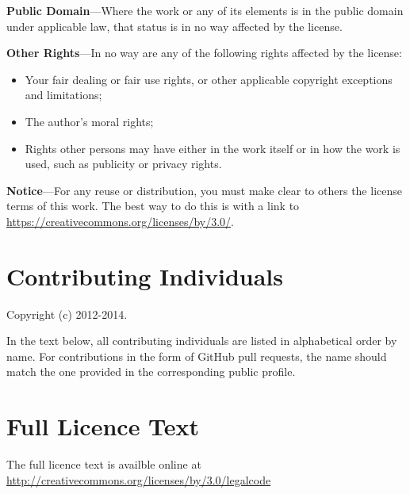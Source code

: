 \documentclass[a4paper,10pt,twoside]{book}
\begin{document}
\noindent \textbf{Public Domain}---Where the work or any of its
elements is in the public domain under applicable law, that status is
in no way affected by the license.

\noindent \textbf{Other Rights}---In no way are any of the following
rights affected by the license:

\begin{itemize}
\item Your fair dealing or fair use rights, or other applicable
copyright exceptions and limitations;

\item The author's moral rights;

\item Rights other persons may have either in the work itself or in
how the work is used, such as publicity or privacy rights.
\end{itemize}

\noindent \textbf{Notice}---For any reuse or distribution, you must make clear to
others the license terms of this work. The best way to do this is with
a link to \url{https://creativecommons.org/licenses/by/3.0/}.

\section{Contributing Individuals}

Copyright (c) 2012-2014.

\noindent In the text below, all contributing individuals are listed in alphabetical order by name. 
For contributions in the form of GitHub pull requests, the name should match the one provided in the corresponding public profile.

\noindent


\section{Full Licence Text}

The full licence text is availble online at 
\url{http://creativecommons.org/licenses/by/3.0/legalcode}




\ifx\wholebook\relax\else
   
   
\end{document}
